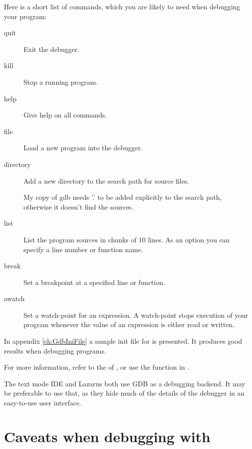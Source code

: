 Here is a short list of  commands, which you are likely to need when
debugging your program:
\begin{description}
\item [quit\ ] Exit the debugger.
\item [kill\ ] Stop a running program.
\item [help\ ] Give help on all  commands.
\item [file\ ] Load a new program into the debugger.
\item [directory\ ] Add a new directory to the search path for source
files.\\
\begin{remark}
My copy of gdb needs '.' to be added explicitly to the search
path, otherwise it doesn't find the sources.
\end{remark}
\item [list\ ] List the program sources in chunks of 10 lines. As an option you can
specify a line number or function name.
\item [break\ ] Set a breakpoint at a specified line or function.
\item [awatch\ ] Set a watch-point for an expression. A watch-point stops
execution of your program whenever the value of an expression is either
read or written.
\end{description}

In appendix {\ref{ch:GdbIniFile}} a sample init file for
 is presented. It produces good results when debugging \fpc programs.

For more information, refer to the  of \userref, or use the
 function in .

The text mode IDE and Lazarus both use GDB as a debugging backend. It may
be preferable to use that, as they hide much of the details of the debugger
in an easy-to-use user interface.

\section{Caveats when debugging with }

